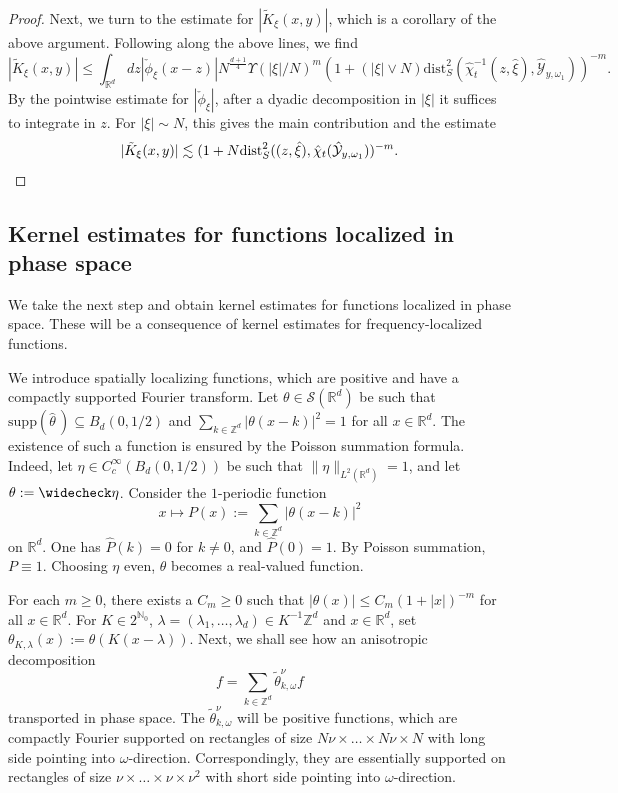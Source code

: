 \documentclass{amsart}
\numberwithin{equation}{section}
\theoremstyle{definition}
\newcommand{\R}{\mathbb{R}}
\newcommand{\Rd}{\mathbb{R}^{d}}
\newcommand{\N}{\mathbb{N}}
\newcommand{\Z}{\mathbb{Z}}
\newcommand {\Sw}{\mathcal{S}}
\newcommand {\supp}{\mathrm{supp}}
\begin{document}
\begin{proof}
Next, we turn to the estimate for $|\tilde{K}_{\xi}(x,y)|$, which is a corollary of the above argument. Following along the above lines, we find
\begin{equation*}
    |\tilde{K}_{\xi}(x,y)| \leq \int_{\R^d} dz |\check{\phi}_{\xi}(x-z)| N^{\frac{d+1}{4}} \Upsilon(|\xi|/N)^m (1+ (|\xi| \vee N) \text{dist}_S^2(\hat{\chi}_t^{-1}(z,\hat{\xi}),\hat{\mathcal{Y}}_{y,\omega_1}))^{-m}.
\end{equation*}
By the pointwise estimate for $|\check{\phi}_{\xi}|$, after a dyadic decomposition in $|\xi|$ it suffices to integrate in $z$. For $|\xi| \sim N$, this gives the main contribution and the estimate
\begin{equation*}
    |\tilde{K}_{\xi}(x,y)| \lesssim (1+ N \text{dist}_S^2((z,\hat{\xi}),\hat{\chi}_t(\hat{\mathcal{Y}}_{y,\omega_1}))^{-m}.\qedhere
\end{equation*}
\end{proof}

\subsection{Kernel estimates for functions localized in phase space}
\label{subsection:KernelBoundsPhaseSpace}
We take the next step and obtain kernel estimates for functions localized in phase space. These will be a consequence of kernel estimates for frequency-localized functions.

We introduce spatially localizing functions, which are positive and have a compactly supported Fourier transform. Let $\theta\in \Sw(\Rd)$ be such that $\supp(\widehat{\theta}\,) \subseteq B_{d}(0,1/2)$ and $\sum_{k \in \Z^d} |\theta(x-k)|^2=1$ for all $x\in\Rd$. The existence of such a function is ensured by the Poisson summation formula.
Indeed, let $\eta \in C^\infty_c(B_{d}(0,1/2))$ be such that $\| \eta \|_{L^2(\Rd)} = 1$, and let $\theta:=\widecheck\eta$. Consider the $1$-periodic function
\begin{equation*}
x\mapsto P(x):=\sum_{k \in \Z^d} |\theta(x-k)|^2
\end{equation*}
on $\R^{d}$. One has $\widehat{P}(k)=0$ for $k\neq0$, and $\widehat{P}(0)=1$. By Poisson summation, $P \equiv 1$. Choosing $\eta$ even, $\theta$ becomes a real-valued function.

For each $m\geq0$, there exists a $C_{m}\geq0$ such that $|\theta(x)| \leq C_m (1+|x|)^{-m}$ for all $x\in\Rd$.  
For $K \in 2^{\N_{0}}$, $\lambda=(\lambda_{1},\ldots,\lambda_{d})\in K^{-1} \Z^{d}$ and $x\in\Rd$, set $\theta_{K,\lambda}(x) := \theta(K(x-\lambda))$. Next, we shall see how an anisotropic decomposition
\begin{equation*}
f = \sum_{k \in \Z^d} \tilde{\theta}^{\nu}_{k,\omega} f
\end{equation*}
transported in phase space. The $\tilde{\theta}_{k,\omega}^{\nu}$ will be positive functions, which are compactly Fourier supported on rectangles of size $N \nu \times \ldots \times N \nu \times N $ with long side pointing into $\omega$-direction. Correspondingly, they are essentially supported on rectangles of size $\nu \times \ldots \times \nu \times \nu^2$ with short side pointing into $\omega$-direction.
\end{document}
